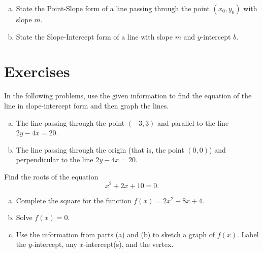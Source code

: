 \documentclass[12pt]{amsart}
\begin{document}
\begin{thm}[2 Points]\label{ex1}
  \begin{enumerate}[(a)]
  \item
    State the Point-Slope form of a line passing through the point $(x_0, y_0)$ with slope $m$.
    \vspace{1in}
  \item
    State the Slope-Intercept form of a line with slope $m$ and $y$-intercept $b$.
    \vspace{1in}
  \end{enumerate}
\end{thm}
\newpage
\section{Exercises}

\begin{thm}[18 Points]\label{ex5}
  In the following problems, use the given information to find the equation of the line in slope-intercept form and then graph the lines.
  \begin{enumerate}[(a)]
  \item
    The line passing through the point $(-3, 3)$ and parallel to the line $2y - 4x = 20$.
    \vspace{3in}
  \item
    The line passing through the origin (that is, the point $(0,0)$) and perpendicular to the line $2y - 4x = 20$.
    \vspace{2in}
  \end{enumerate}
  \vspace{1in}
\end{thm}

\newpage
\begin{thm}[18 Points]\label{ex9}
  Find the roots of the equation
  $$x^2 + 2x + 10 = 0.$$
  \vspace{2in}
\end{thm}

\begin{thm}[18 Points]\label{ex10}
  \begin{enumerate}[(a)]
  \item
    Complete the square for the function $f(x) = 2x^2 - 8x + 4$.
    \vspace{1in}
  \item
    Solve $f(x) = 0$.
    \vspace{1in}
  \item
    Use the information from parts (a) and (b) to sketch a graph of $f(x)$.
    Label the $y$-intercept, any $x$-intercept(s), and the vertex.
    \vspace{2in}
  \end{enumerate}
\end{thm}
\end{document}
